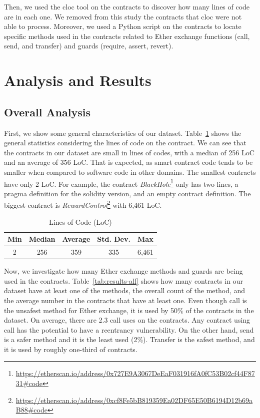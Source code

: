\documentclass[10pt,conference]{IEEEtran}
\begin{document}
Then, we used the cloc tool on the contracts to discover how many lines of code are in each one. We removed from this study the contracts that cloc were not able to process. Moreover, we used a Python script on the contracts to locate specific methods used in the contracts related to Ether exchange functions (call, send, and transfer) and guards (require, assert, revert).

\section{Analysis and Results}

\subsection{Overall Analysis}

First, we show some general characteristics of our dataset.
Table~\ref{tab:loc} shows the general statistics considering the lines of code on the contract. We can see that the contracts in our dataset are small in lines of codes, with a median of 256 LoC and an average of 356 LoC. That is expected, as smart contract code tends to be smaller when compared to software code in other domains.  The smallest contracts have only 2 LoC.  For example, the contract \textit{BlackHole}\footnote{\url{https://etherscan.io/address/0x727E9A3067DeEaF031916fA0fC53B02cf44F8731\#code}} only has two lines, a pragma definition for the solidity version, and an empty contract definition. The biggest contract is \textit{RewardControl}\footnote{\url{https://etherscan.io/address/0xcf8Fe5bB819359Ea02DF65E50B6194D12b69aB88\#code}} with 6,461 LoC. 

\begin{table}
\center
  \caption{Lines of Code (LoC)}
  \label{tab:loc}
  \begin{tabular}{c c c c c}
    \hline
    Min & Median & Average & Std. Dev. & Max \\
    \hline
   2 & 256 & 359 & 335 & 6,461 \\
  \hline
\end{tabular}
\end{table}

Now, we investigate how many Ether exchange methods and guards are being used in the contracts. Table~\ref{tab:results-all} shows how many contracts in our dataset have at least one of the methods, the overall count of the method, and the average number in the contracts that have at least one. Even though call is the unsafest method for Ether exchange, it is used by 50\% of the contracts in the dataset. On average, there are 2.3 call uses on the contracts. Any contract using call has the potential to have a reentrancy vulnerability. On the other hand, send is a safer method and it is the least used (2\%). Transfer is the safest method, and it is used by roughly one-third of contracts.
\end{document}
